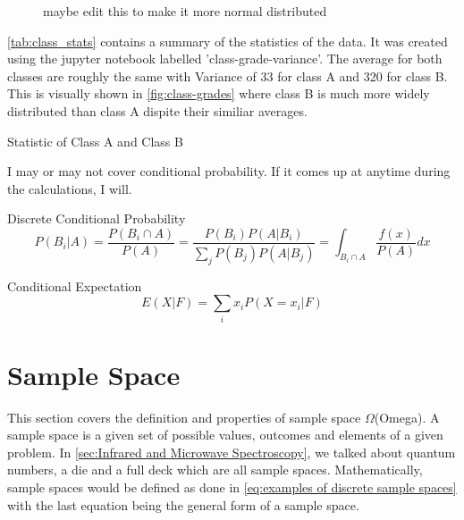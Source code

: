 \documentclass[11pt,a4paper]{book}
\newcommand{\imginput}[1]{} %
\newcommand{\tabinput}[1]{}
\begin{document}
		\begin{figure} [!ht]
			\centering
			\def\svgwidth{\columnwidth}
			\resizebox{14cm}{!}{\imginput{images/class-grades.pdf_tex}}
			\caption{maybe edit this to make it more normal distributed}
			\label{fig:class-grades}
		\end{figure}
		
		\noindent
		\autoref{tab:class_stats} contains a summary of the statistics of the data. It was created using the jupyter notebook labelled  'class-grade-variance'. The average for both classes are roughly the same with Variance of 33 for class A and 320 for class B. This is visually shown in \autoref{fig:class-grades} where class B is much more widely distributed than class A dispite their similiar averages.

		\begin{table} [!ht]
			\centering
			\tabinput{datatables/class_stats.tex}
			\caption{Statistic of Class A and Class B}
			\label{tab:class_stats}
		\end{table}
		
		\noindent
		I may or may not cover conditional probability. If it comes up at anytime during the calculations, I will.
		
		Discrete Conditional Probability
		\begin{equation}
			P(B_i|A)=\dfrac{P(B_i \cap A)}{P(A)}
			=\dfrac{P(B_i)P(A|B_i)}{\displaystyle \sum_j{P(B_j)P(A|B_j)}}
			=\int_{B_i\cap A}{\dfrac{f(x)}{P(A)}dx}
		\end{equation}

		Conditional Expectation
		\begin{equation}
			E(X|F)=\sum_i{x_i P(X=x_i|F)}
		\end{equation}
	\section{Sample Space}
		\label{sec:Sample Space}
		This section covers the definition and properties of sample space $\Omega$(Omega). A sample space is a given set of possible values, outcomes and elements of a given problem. In \autoref{sec:Infrared and Microwave Spectroscopy}, we talked about quantum numbers, a die and a full deck which are all sample spaces. Mathematically, sample spaces would be defined as done in \autoref{eq:examples of discrete sample spaces} with the last equation being the general form of a sample space.
		
\end{document}
